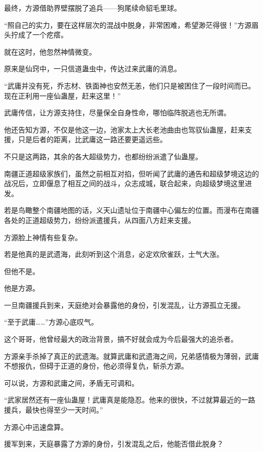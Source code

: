 \begin{this_body}
最终，方源借助界壁摆脱了追兵——狗尾续命貂毛里球。

“照自己的实力，要在这样层次的混战中脱身，非常困难，希望渺茫得很！”方源眉头拧成了一个疙瘩。

就在这时，他忽然神情微变。

原来是仙窍中，一只信道蛊虫中，传达过来武庸的消息。

“武庸并没有死，乔志材、铁面神也安然无恙，他们只是被困住了一段时间而已。现在正利用一座仙蛊屋，赶来这里！”

武庸传信，让方源支持住，尽量保全自身性命，哪怕临阵脱逃也无所谓。

他还告知方源，不仅是他这一边，池家太上大长老池曲由也驾驭仙蛊屋，赶来支援，只是后者的距离，比武庸这一路还要更遥远些。

不只是这两路，其余的各大超级势力，也都纷纷派遣了仙蛊屋。

南疆正道超级家族们，虽然之前相互对掐，但听闻了武庸的通告和超级梦境这边的战况后，立即偃息了相互之间的战斗，众志成城，联合起来，向超级梦境这里进发。

若是鸟瞰整个南疆地图的话，义天山遗址位于南疆中心偏左的位置。而漫布在南疆各处的正道超级势力，纷纷派遣援兵，从四面八方赶来支援。

方源脸上神情有些复杂。

若是他真的是武遗海，此刻听到这个消息，必定欢欣雀跃，士气大涨。

但他不是。

他是方源。

一旦南疆援兵到来，天庭绝对会暴露他的身份，引发混乱，让方源孤立无援。

“至于武庸……”方源心底叹气。

这个哥哥，他曾经最大的政治背景，搞不好就会成为今后最强大的追杀者。

方源亲手杀掉了真正的武遗海。就算武庸和武遗海之间，兄弟感情极为薄弱，武庸不想报仇，但碍于正道的身份，他必须得复仇，斩杀方源。

可以说，方源和武庸之间，矛盾无可调和。

“武家居然还有一座仙蛊屋！武庸真是能隐忍。他来的很快，不过就算最近的一路援兵，最快也得至少一天时间。”

方源心中迅速盘算。

援军到来，天庭暴露了方源的身份，引发混乱之后，他能否借此脱身？

\end{this_body}

